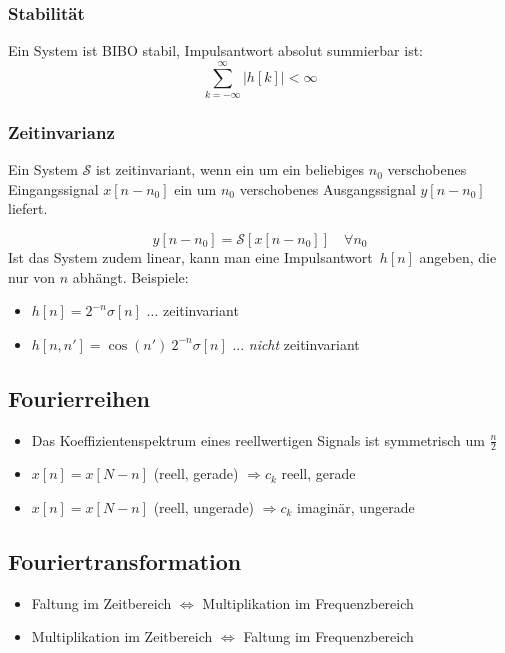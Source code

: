 \documentclass[a4paper, 12pt]{article}
\begin{document}
\subsubsection{Stabilität}

Ein System ist BIBO stabil, Impulsantwort absolut summierbar ist:
\[
    \sum_{k=-\infty}^{\infty} \left| h[k] \right| < \infty
\]

\subsubsection{Zeitinvarianz}

Ein System $\mathcal{S}$ ist zeitinvariant, wenn ein um ein beliebiges $n_0$ verschobenes Eingangssignal $x[n-n_0]$ ein um $n_0$ verschobenes Ausgangssignal $y[n-n_0]$ liefert.

\[
y[n-n_0] = \mathcal{S} \left[ x[n-n_0]\right] \quad \forall n_0
\]
Ist das System zudem linear, kann man eine Impulsantwort~$h[n]$ angeben, die nur von $n$ abhängt.
Beispiele:
\begin{itemize}
  \item $h[n] = 2^{-n} \sigma[n]$ ... zeitinvariant
  \item $h[n, n'] = \cos(n')~2^{-n} \sigma[n]$ ... \emph{nicht} zeitinvariant
\end{itemize}

\subsection{Fourierreihen}

\begin{itemize}
    \item Das Koeffizientenspektrum eines reellwertigen Signals ist symmetrisch um $\frac{n}{2}$
    \item $x[n] = x[N-n]$ (reell, gerade) $⇒c_k$ reell, gerade
    \item $x[n] = x[N-n]$ (reell, ungerade) $⇒c_k$ imaginär, ungerade
\end{itemize}

\subsection{Fouriertransformation}

\begin{itemize}
    \item Faltung im Zeitbereich $⇔$ Multiplikation im Frequenzbereich
    \item Multiplikation im Zeitbereich $⇔$ Faltung im Frequenzbereich
\end{itemize}
\end{document}
